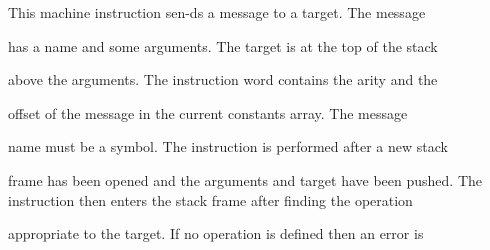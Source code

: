       This machine instruction sen-ds a message to a target. The message

      has a name and some arguments. The target is at the top of the stack

      above the arguments. The instruction word contains the arity and the

      offset of the message in the current constants array. The message

      name must be a symbol. The instruction is performed after a new stack

      frame has been opened and the arguments and target have been pushed. 
      The instruction then enters the stack frame after finding the operation

      appropriate to the target. If no operation is defined then an error is

